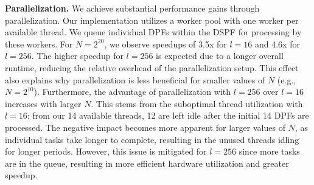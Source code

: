 \textbf{Parallelization.} We achieve substantial performance gains through parallelization. Our implementation utilizes a worker pool with one worker per available thread. We queue individual DPFs within the DSPF for processing by these workers. For $N=2^{20}$, we observe speedups of 3.5x for $l=16$ and 4.6x for $l=256$. The higher speedup for $l=256$ is expected due to a longer overall runtime, reducing the relative overhead of the parallelization setup. This effect also explains why parallelization is less beneficial for smaller values of $N$ (e.g., $N=2^{10}$). Furthermore, the advantage of parallelization with $l=256$ over $l=16$ increases with larger $N$. This stems from the suboptimal thread utilization with $l=16$: from our 14 available threads, 12 are left idle after the initial 14 DPFs are processed. The negative impact becomes more apparent for larger values of $N$, as individual tasks take longer to complete, resulting in the unused threads idling for longer periods. However, this issue is mitigated for $l=256$ since more tasks are in the queue, resulting in more efficient hardware utilization and greater speedup.

